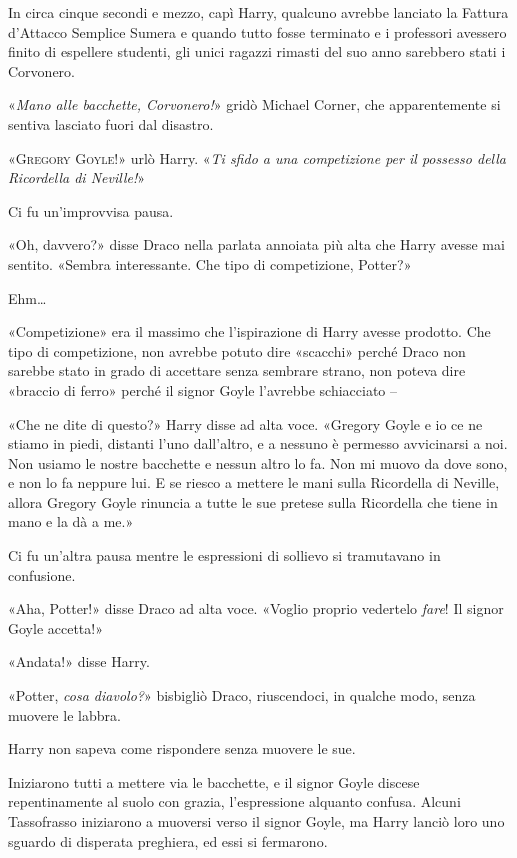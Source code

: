 In circa cinque secondi e mezzo, capì Harry, qualcuno avrebbe lanciato la Fattura d’Attacco Semplice Sumera e quando tutto fosse terminato e i professori avessero finito di espellere studenti, gli unici ragazzi rimasti del suo anno sarebbero stati i Corvonero.

«\textit{Mano alle bacchette, Corvonero!}» gridò Michael Corner, che apparentemente si sentiva lasciato fuori dal disastro.

«\textsc{Gregory Goyle!}» urlò Harry. «\textit{Ti sfido a una competizione per il possesso della Ricordella di Neville!}»

Ci fu un’improvvisa pausa.

«Oh, davvero?» disse Draco nella parlata annoiata più alta che Harry avesse mai sentito. «Sembra interessante. Che tipo di competizione, Potter?»

Ehm…

«Competizione» era il massimo che l’ispirazione di Harry avesse prodotto. Che tipo di competizione, non avrebbe potuto dire «scacchi» perché Draco non sarebbe stato in grado di accettare senza sembrare strano, non poteva dire «braccio di ferro» perché il signor Goyle l’avrebbe schiacciato –

«Che ne dite di questo?» Harry disse ad alta voce. «Gregory Goyle e io ce ne stiamo in piedi, distanti l’uno dall’altro, e a nessuno è permesso avvicinarsi a noi. Non usiamo le nostre bacchette e nessun altro lo fa. Non mi muovo da dove sono, e non lo fa neppure lui. E se riesco a mettere le mani sulla Ricordella di Neville, allora Gregory Goyle rinuncia a tutte le sue pretese sulla Ricordella che tiene in mano e la dà a me.»

Ci fu un’altra pausa mentre le espressioni di sollievo si tramutavano in confusione.

«Aha, Potter!» disse Draco ad alta voce. «Voglio proprio vedertelo \textit{fare}! Il signor Goyle accetta!»

«Andata!» disse Harry.

«Potter, \textit{cosa diavolo?}» bisbigliò Draco, riuscendoci, in qualche modo, senza muovere le labbra.

Harry non sapeva come rispondere senza muovere le sue.

Iniziarono tutti a mettere via le bacchette, e il signor Goyle discese repentinamente al suolo con grazia, l’espressione alquanto confusa. Alcuni Tassofrasso iniziarono a muoversi verso il signor Goyle, ma Harry lanciò loro uno sguardo di disperata preghiera, ed essi si fermarono.

